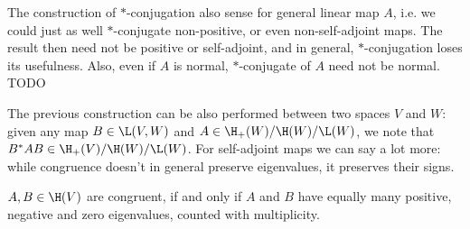 The construction of $*$-conjugation also sense for general linear map $A$, i.e. we could just as well $*$-conjugate non-positive, or even non-self-adjoint maps. The result then need not be positive or self-adjoint, and in general, $*$-conjugation loses its usefulness. Also, even if $A$ is normal, $*$-conjugate of $A$ need not be normal. TODO

The previous construction can be also performed between two spaces $V$ and $W$: given any map $B \in \L(V, W)$ and $A \in \H_{+}(W)/\H(W)/\L(W)$, we note that $B^{*}AB \in \H_{+}(V)/\H(W)/\L(W)$. For self-adjoint maps we can say a lot more: while congruence doesn't in general preserve eigenvalues, it preserves their signs.

\begin{lause}
	$A, B \in \H(V)$ are congruent, if and only if $A$ and $B$ have equally many positive, negative and zero eigenvalues, counted with multiplicity.
\end{lause}

